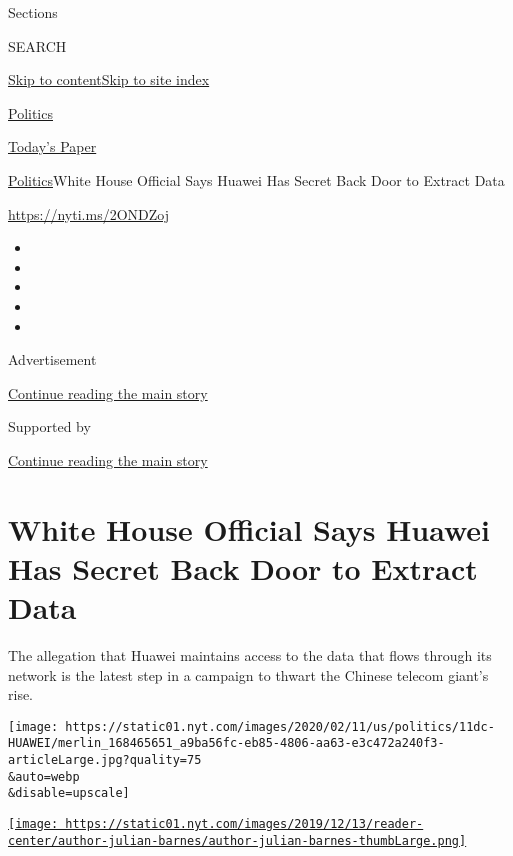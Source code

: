 Sections

SEARCH

\protect\hyperlink{site-content}{Skip to
content}\protect\hyperlink{site-index}{Skip to site index}

\href{https://www.nytimes.com/section/politics}{Politics}

\href{https://myaccount.nytimes.com/auth/login?response_type=cookie\&client_id=vi}{}

\href{https://www.nytimes.com/section/todayspaper}{Today's Paper}

\href{/section/politics}{Politics}\textbar{}White House Official Says
Huawei Has Secret Back Door to Extract Data

\url{https://nyti.ms/2ONDZoj}

\begin{itemize}
\item
\item
\item
\item
\item
\end{itemize}

Advertisement

\protect\hyperlink{after-top}{Continue reading the main story}

Supported by

\protect\hyperlink{after-sponsor}{Continue reading the main story}

\hypertarget{white-house-official-says-huawei-has-secret-back-door-to-extract-data}{%
\section{White House Official Says Huawei Has Secret Back Door to
Extract
Data}\label{white-house-official-says-huawei-has-secret-back-door-to-extract-data}}

The allegation that Huawei maintains access to the data that flows
through its network is the latest step in a campaign to thwart the
Chinese telecom giant's rise.

\texttt{[image: https://static01.nyt.com/images/2020/02/11/us/politics/11dc-HUAWEI/merlin\_168465651\_a9ba56fc-eb85-4806-aa63-e3c472a240f3-articleLarge.jpg?quality=75\\\&auto=webp\\\&disable=upscale]}

\href{https://www.nytimes.com/by/julian-e-barnes}{\texttt{[image: https://static01.nyt.com/images/2019/12/13/reader-center/author-julian-barnes/author-julian-barnes-thumbLarge.png]}}


